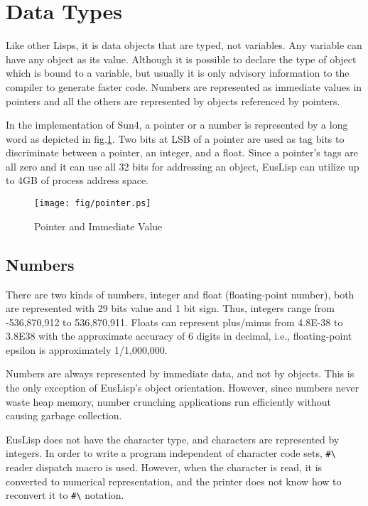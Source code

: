 
\section{Data Types}
Like other Lisps, it is data objects that are typed, not variables.
Any variable can have any object as its value.
Although it is possible to
declare the type of object which is bound to a variable, but usually
it is only advisory information to the compiler to generate faster code.
Numbers are represented as immediate values in pointers and all the others
are represented by objects referenced by pointers.

In the implementation of Sun4, a pointer or a number is represented by
a long word as depicted in fig.\ref{Pointer}.
Two bits at LSB of a pointer are used as tag bits to discriminate
between a pointer, an integer, and a float.
Since a pointer's tags are all zero and it can use all 32 bits for
addressing an object, EusLisp can utilize up to 4GB of process
address space.

\begin{figure}[hb]
\begin{center}
\texttt{[image: fig/pointer.ps]}
\end{center}
\caption{\label{Pointer}Pointer and Immediate Value}
\end{figure}

\subsection{Numbers}

There are two kinds of numbers,
integer and float (floating-point number), both are represented
with 29 bits value and 1 bit sign.
Thus, integers range from -536,870,912 to 536,870,911.
Floats can represent plus/minus from 4.8E-38 to 3.8E38 with the
approximate accuracy of 6 digits in decimal, i.e.,
floating-point epsilon is approximately 1/1,000,000.

Numbers are always represented by immediate data, and not by objects.
This is the only exception of EusLisp's object orientation.
However, since numbers never waste heap memory, number crunching applications
run efficiently without causing garbage collection.

EusLisp does not have the character type,
and characters are represented by integers.
In order to write a program independent of character code sets,
\verb+#\+ reader dispatch macro is used.
However, when the character is read,
it is converted to numerical representation, and the printer does not
know how to reconvert it to
\verb+#\+ notation.

